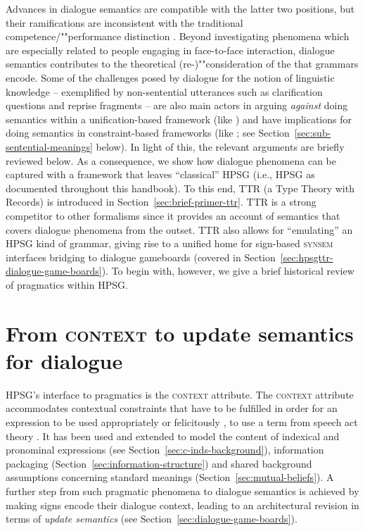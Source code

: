 \documentclass[output=paper]{langsci/langscibook}
\begin{document}
{Advances in dialogue semantics are compatible with the latter two positions, but their ramifications are inconsistent with the traditional competence/""performance distinction \citep{Ginzburg:Poesio:2016,Kempson:Cann:Gregoromichelaki:Chatzikyriakidis:2016}. 
%
Beyond investigating phenomena which are especially related to people engaging in face-to-face interaction, dialogue semantics contributes to the theoretical (re-)""consideration of the  that grammars encode.
%
Some of the challenges posed by dialogue for the notion of linguistic knowledge -- exemplified by non-sentential utterances such as clarification questions and reprise fragments \citep{Fernandez:Ginzburg:2002,Fernandez:Ginzburg:Lappin:2007} -- are also main actors in arguing \emph{against} doing semantics within a unification-based framework (like \citet{Pollard:Sag:1987}) and have implications for doing semantics in constraint-based frameworks (like \citet{Pollard:Sag:1994}; see Section~\ref{sec:sub-sentential-meanings} below).
%
In light of this, the relevant arguments are briefly reviewed below.
%
As a consequence, we show how dialogue phenomena can be captured with a framework that leaves \enquote{classical} HPSG (i.e., HPSG as documented throughout this handbook).
%
To this end, TTR (a Type Theory with Records) is introduced in Section~\ref{sec:brief-primer-ttr}. 
%
TTR is a strong competitor to other formalisms since it provides an account of semantics that covers dialogue phenomena from the outset.
%
TTR also allows for \enquote{emulating} an HPSG kind of grammar, giving rise to a unified home for sign-based \textsc{synsem} interfaces bridging to dialogue gameboards (covered in Section~\ref{sec:hpsgttr-dialogue-game-boards}).
%
To begin with, however, we give a brief historical review of pragmatics within HPSG.







\section{From \textsc{context} to update semantics for dialogue}
\label{sec:history}

HPSG's interface to pragmatics is the \textsc{context} attribute. 
%
The \textsc{context}  attribute accommodates contextual constraints that have to be fulfilled in order for an expression to be used appropriately or felicitously \citep{Austin:1962}, to use a term from speech act theory \citep[]{Pollard:Sag:1994}.
%
It has been used and extended to model the content of indexical and pronominal expressions (see Section~\ref{sec:c-inds-background}), information packaging (Section~\ref{sec:information-structure}) and shared background assumptions concerning standard meanings (Section~\ref{sec:mutual-beliefs}).
%
A further step from such pragmatic phenomena to dialogue semantics is achieved  by making signs encode their dialogue context, leading to an architectural revision in terms of \emph{update semantics} (see Section~\ref{sec:dialogue-game-boards}).


}
\end{document}
